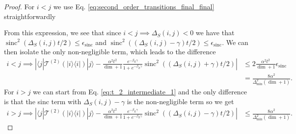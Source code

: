\documentclass{article}
\newcommand{\ket}[1]{|#1\rangle}
\newcommand{\bra}[1]{\langle #1|}
\newcommand{\ketbra}[2]{| #1\rangle\! \langle #2|}
\newcommand{\parens}[1]{\left( #1 \right)}
\DeclareMathOperator{\sinc}{sinc}
\begin{document}
\begin{proof}
    For $i < j$ we use Eq. \eqref{eq:second_order_transitions_final_final} straightforwardly
    
    From this expression, we see that since $i < j \implies \Delta_S(i,j) < 0$ we have that $\sinc^2(\Delta_S(i,j)t/2) \leq \epsilon_{\sinc}$ and $\sinc^2((\Delta_S(i,j) - \gamma)t/2) \le \epsilon_{\sinc}$. We can then isolate the only non-negligible term, which leads to the difference
    \begin{align}
        i < j \implies \left| \bra{j}\mathcal{T}^{(2)}(\ketbra{i}{i})\ket{j} - \frac{\alpha^2 t^2}{\dim + 1} \frac{e^{-\beta_E \gamma}}{1 + e^{-\beta_E \gamma}} \sinc^2 \parens{(\Delta_S(i,j) + \gamma) t/ 2} \right| &\le 2 \frac{\alpha^2 t^2}{\dim + 1} \epsilon_{\sinc} \\
        &= \frac{8 \alpha^2}{\Delta_{\min}^2 (\dim + 1)}.
    \end{align}
    For $i > j$ we can start from Eq. \ref{eq:t_2_intermediate_1} and the only difference is that the sinc term with $\Delta_S(i,j) - \gamma$ is the non-negligible term so we get
    \begin{align}
    i > j \implies \left| \bra{j}\mathcal{T}^{(2)}(\ketbra{i}{i})\ket{j} - \frac{\alpha^2 t^2}{\dim + 1} \frac{e^{-\beta_E \gamma}}{1 + e^{-\beta_E \gamma}} \sinc^2 \parens{(\Delta_S(i,j) - \gamma) t/ 2} \right| &\le \frac{8 \alpha^2}{\Delta_{\min}^2 (\dim + 1)}.
        \end{align}
     

\end{proof}
\end{document}
